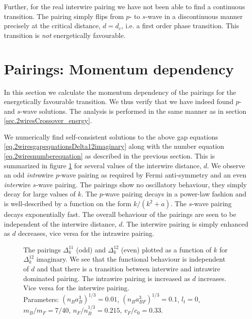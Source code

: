Further, for the real interwire pairing we have not been able to find a continuous transition. The pairing simply flips from $p$- to $s$-wave in a discontinuous manner precisely at the critical distance, $d = d_c$, i.e. a first order phase transition. This transition is \textit{not} energetically favourable. 

\section{Pairings: Momentum dependency} \label{sec.pairingsfunctionalbehaviour}
In this section we calculate the momentum dependency of the pairings for the energetically favourable transition. We thus verify that we have indeed found $p$- and $s$-wave solutions. The analysis is performed in the same manner as in section \ref{sec.2wiresCrossover_energy}.

We numerically find self-consistent solutions to the above gap equations \eqref{eq.2wiresgapequationsDelta12imaginary} along with the number equation \eqref{eq.2wiresnumberequation} as described in the previous section. This is summarized in figure \ref{fig.pairingkdependT0dvaried} for several values of the interwire distance, $d$. We observe an odd \textit{intra}wire $p$-wave pairing as required by Fermi anti-symmetry and an even \textit{inter}wire $s$-wave pairing. The pairings show no oscillatory behaviour, they simply decay for large values of $k$. The $p$-wave pairing decays in a power-law fashion and is well-described by a function on the form $k / (k^2 + a)$. The $s$-wave pairing decays exponentially fast. The overall behaviour of the pairings are seen to be independent of the interwire distance, $d$. The interwire pairing is simply enhanced as $d$ decreases, vice versa for the intrawire pairing.  

\begin{figure} 
\begin{center}  
  
\caption{The pairings $\Delta^{11}_k$ (odd) and $\Delta^{12}_k$ (even) plotted as a function of $k$ for $\Delta^{12}_k$ imaginary. We see that the functional behaviour is independent of $d$ and that there is a transition between interwire and intrawire dominated pairing. The intrawire pairing is increased as $d$ increases. Vice versa for the interwire pairing. \\
Parameters: $(n_Ba_B^3)^{1/3} = 0.01$, $(n_Ba_{BF}^3)^{1/3} = 0.1$, $l_t = 0$, $m_B / m_F = 7/40$, $n_F / n_B^{1/3} = 0.215$, $v_F / c_0 = 0.33$. }  
\label{fig.pairingkdependT0dvaried}  
\end{center}    
\end{figure}

